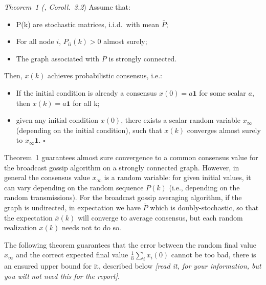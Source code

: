 \documentclass[oneside]{article}
\begin{document}
	\textit{Theorem~1 (\cite{gossip-converg-as}, Coroll.~3.2})\qquad
	Assume that:
		\begin{itemize}
		\item P(k) are stochastic matrices, i.i.d.\ with mean $\bar P$; 
		\item For all node $i$, $P_{ii}(k)>0$ almost surely;
		\item The graph associated with $\bar P$ is strongly connected.
		\end{itemize}
	Then, $x(k)$ achieves probabilistic consensus, i.e.:
		\begin{itemize}
		\item If the initial condition is already a consensus $x(0) = a \mathbf 1$ for some scalar $a$, then
		$x(k) = a \mathbf 1$ for all k;
		\item given any initial condition $x(0)$, there exists a scalar random variable $x_{\infty}$ (depending on the initial condition), such that $x(k)$ converges almost surely to $x_{\infty} \mathbf 1$. 	\hfill $\square$ 
		\end{itemize}


	 Theorem~1 guarantees almost sure convergence to a common consensus value for the broadcast gossip algorithm on a strongly connected graph. However, in general the consensus value $x_{\infty}$ is a random variable: for given initial values, it can vary depending on the random sequence $P(k)$ (i.e., depending on the random transmissions). For the broadcast gossip averaging algorithm, if the graph is undirected, in expectation we have $\bar P$ which is doubly-stochastic, so that the expectation $\bar x(k)$ will converge to average consensus, but each random realization $x(k)$ needs not to do so.
	 
	  The following theorem guarantees that the error between the random final value $x_{\infty}$ and the correct expected final value $\frac{1}{n}\sum_i x_i(0)$ cannot be too bad, there is an ensured upper bound for it, described below \textit{[read it, for your information, but you will not need this for the report]}.
\end{document}
